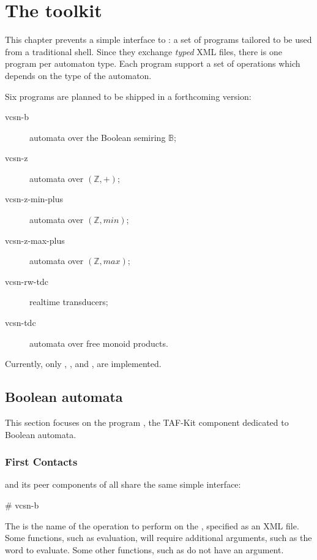 \chapter{The \Vauc toolkit}

This chapter prevents a simple interface to \Vauc: a set of programs
tailored to be used from a traditional shell.  Since they exchange
\emph{typed} XML files, there is one program per automaton type.  Each
program support a set of operations which depends on the type of the
automaton.

Six programs are planned to be shipped in a forthcoming version:
\begin{description}
\item[vcsn-b] automata over the Boolean semiring $\mathbb{B}$;
\item[vcsn-z] automata over $(\mathbb{Z},+)$;
\item[vcsn-z-min-plus] automata over $(\mathbb{Z},min)$;
\item[vcsn-z-max-plus] automata over $(\mathbb{Z},max)$;
\item[vcsn-rw-tdc] realtime transducers;
\item[vcsn-tdc] automata over free monoid products.
\end{description}

Currently, only , , and
, are implemented.

\newpage

\section{Boolean automata}

This section focuses on the program , the
TAF-Kit component dedicated to Boolean automata.

\subsection{First Contacts}

 and its peer components of \tafkit all share the same
simple interface:

\begin{shell}
# vcsn-b   
\end{shell}

\noindent
The  is the name of the operation to perform on the
, specified as an XML file.  Some functions, such as
evaluation, will require additional arguments, such as the word to
evaluate.  Some other functions, such as  do not have
an  argument.

